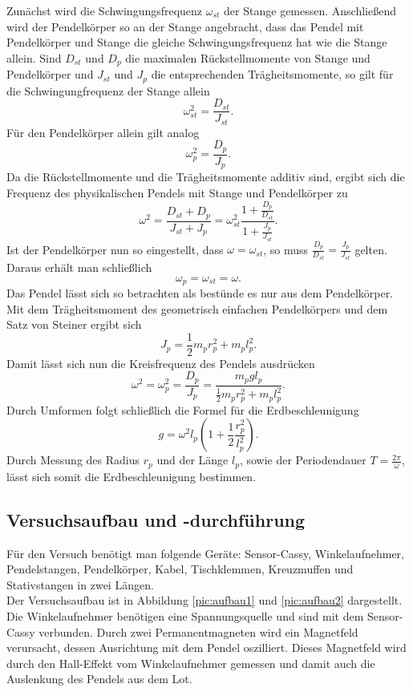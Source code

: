 Zunächst wird die Schwingungsfrequenz $\omega_{st}$ der Stange gemessen. Anschließend wird der Pendelkörper so an der Stange angebracht, dass das Pendel mit Pendelkörper und Stange die gleiche Schwingungsfrequenz hat wie die Stange allein. Sind $D_{st}$ und $D_p$ die maximalen Rückstellmomente von Stange und Pendelkörper und $J_{st}$ und $J_p$ die entsprechenden Trägheitsmomente, so gilt für die Schwingungfrequenz der Stange allein
$$\omega_{st}^2 = \frac{D_{st}}{J_{st}}\text{.}$$
Für den Pendelkörper allein gilt analog
$$\omega_p^2 = \frac{D_p}{J_p}\text{.}$$
Da die Rückstellmomente und die Trägheitsmomente additiv sind, ergibt sich die Frequenz des physikalischen Pendels mit Stange und Pendelkörper zu
$$\omega^2 = \frac{D_{st} + D_p}{J_{st} + J_p} = \omega_{st}^2 \frac{1+\frac{D_p}{D_{st}}}{1+\frac{J_p}{J_{st}}}\text{.}$$
Ist der Pendelkörper nun so eingestellt, dass $\omega = \omega_{st}$, so muss $\frac{D_p}{D_{st}} = \frac{J_p}{J_{st}}$ gelten. Daraus erhält man schließlich
$$\omega_p = \omega_{st} = \omega\text{.}$$
Das Pendel lässt sich so betrachten als bestünde es nur aus dem Pendelkörper. Mit dem Trägheitsmoment des geometrisch einfachen Pendelkörpers und dem Satz von Steiner ergibt sich
$$J_p = \frac 12 m_p r_p^2 + m_pl_p^2\text{.}$$
Damit lässt sich nun die Kreisfrequenz des Pendels ausdrücken
$$\omega^2 = \omega_p^2 = \frac{D_p}{J_p} = \frac{m_pgl_p}{\frac 12 m_pr_p^2+m_pl_p^2}\text{.}$$
Durch Umformen folgt schließlich die Formel für die Erdbeschleunigung
$$g = \omega^2l_p \left( 1 + \frac 12 \frac{r_p^2}{l_p^2} \right)\text{.}$$
Durch Messung des Radius $r_p$ und der Länge $l_p$, sowie der Periodendauer $T = \frac{2\pi}{\omega}$, lässt sich somit die Erdbeschleunigung bestimmen.

\subsection{Versuchsaufbau und -durchführung}
Für den Versuch benötigt man folgende Geräte: Sensor-Cassy, Winkelaufnehmer, Pendelstangen, Pendelkörper, Kabel, Tischklemmen, Kreuzmuffen und  Stativstangen in zwei Längen. \\
Der Versuchsaufbau ist in Abbildung \ref{pic:aufbau1} und \ref{pic:aufbau2} dargestellt. Die Winkelaufnehmer benötigen eine Spannungsquelle und sind mit dem Sensor-Cassy verbunden. Durch zwei Permanentmagneten wird ein Magnetfeld verursacht, dessen Ausrichtung mit dem Pendel oszilliert. Dieses Magnetfeld wird durch den Hall-Effekt vom Winkelaufnehmer gemessen und damit auch die Auslenkung des Pendels aus dem Lot. 

